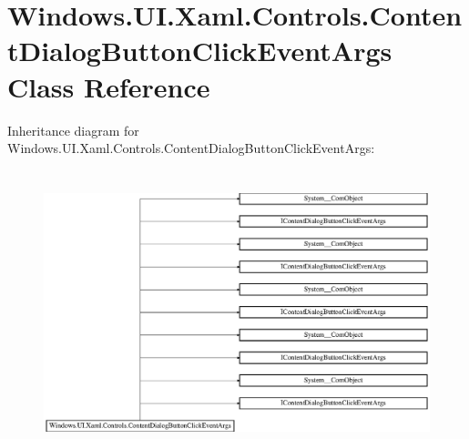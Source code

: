 \hypertarget{class_windows_1_1_u_i_1_1_xaml_1_1_controls_1_1_content_dialog_button_click_event_args}{}\section{Windows.\+U\+I.\+Xaml.\+Controls.\+Content\+Dialog\+Button\+Click\+Event\+Args Class Reference}
\label{class_windows_1_1_u_i_1_1_xaml_1_1_controls_1_1_content_dialog_button_click_event_args}
Inheritance diagram for Windows.\+U\+I.\+Xaml.\+Controls.\+Content\+Dialog\+Button\+Click\+Event\+Args\+:\begin{figure}[H]
\begin{center}
\leavevmode
\includegraphics[height=8.257373cm]{class_windows_1_1_u_i_1_1_xaml_1_1_controls_1_1_content_dialog_button_click_event_args}
\end{center}
\end{figure}
